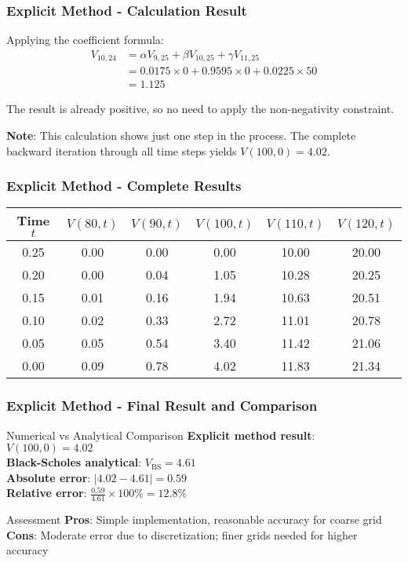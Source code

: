 \documentclass[aspectratio=169]{beamer}
\begin{document}
\begin{frame}
\frametitle{Explicit Method - Calculation Result}
Applying the coefficient formula:
\begin{align}
V_{10,24} &= \alpha V_{9,25} + \beta V_{10,25} + \gamma V_{11,25} \\
&= 0.0175 \times 0 + 0.9595 \times 0 + 0.0225 \times 50 \\
&= 1.125
\end{align}

The result is already positive, so no need to apply the non-negativity constraint.

\textbf{Note}: This calculation shows just one step in the process. The complete backward iteration 
through all time steps yields $V(100,0) = 4.02$.
\end{frame}

\begin{frame}
\frametitle{Explicit Method - Complete Results}
\begin{center}
\begin{tabular}{c|c|c|c|c|c}
Time $t$ & $V(80,t)$ & $V(90,t)$ & $V(100,t)$ & $V(110,t)$ & $V(120,t)$ \\
\hline
0.25 & 0.00 & 0.00 & 0.00 & 10.00 & 20.00 \\
0.20 & 0.00 & 0.04 & 1.05 & 10.28 & 20.25 \\
0.15 & 0.01 & 0.16 & 1.94 & 10.63 & 20.51 \\
0.10 & 0.02 & 0.33 & 2.72 & 11.01 & 20.78 \\
0.05 & 0.05 & 0.54 & 3.40 & 11.42 & 21.06 \\
0.00 & 0.09 & 0.78 & 4.02 & 11.83 & 21.34 \\
\end{tabular}
\end{center}
\end{frame}

\begin{frame}
\frametitle{Explicit Method - Final Result and Comparison}
\begin{block}{Numerical vs Analytical Comparison}
\textbf{Explicit method result}: $V(100, 0) = 4.02$\\
\textbf{Black-Scholes analytical}: $V_{\text{BS}} = 4.61$\\
\textbf{Absolute error}: $|4.02 - 4.61| = 0.59$\\
\textbf{Relative error}: $\frac{0.59}{4.61} \times 100\% = 12.8\%$
\end{block}

\begin{block}{Assessment}
\textbf{Pros}: Simple implementation, reasonable accuracy for coarse grid\\
\textbf{Cons}: Moderate error due to discretization; finer grids needed for higher accuracy
\end{block}
\end{frame}
\end{document}
